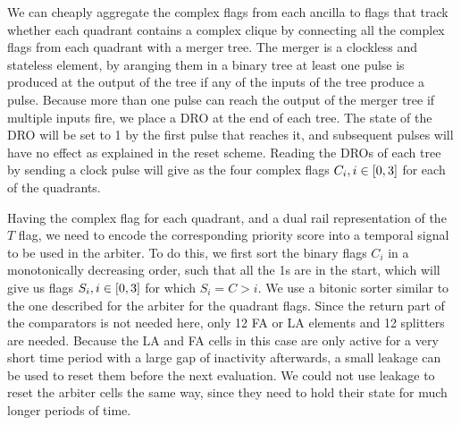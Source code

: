 \documentclass{article}
\begin{document}
We can cheaply aggregate the complex flags from each ancilla to flags that track whether each quadrant contains a complex clique by connecting all the complex flags from each quadrant with a merger tree.
The merger is a clockless and stateless element, by aranging them in a binary tree at least one pulse is produced at the output of the tree if any of the inputs of the tree produce a pulse.
Because more than one pulse can reach the output of the merger tree if multiple inputs fire, we place a DRO at the end of each tree.
The state of the DRO will be set to 1 by the first pulse that reaches it, and subsequent pulses will have no effect as explained in the reset scheme.
Reading the DROs of each tree by sending a clock pulse will give as the four complex flags $C_i, i \in \interval{0}{3}$ for each of the quadrants.

Having the complex flag for each quadrant, and a dual rail representation of the $T$ flag, we need to encode the corresponding priority score into a temporal signal to be used in the arbiter.
To do this, we first sort the binary flags $C_i$ in a monotonically decreasing order, such that all the 1s are in the start, which will give us flags $S_i, i \in \interval{0}{3}$ for which $S_i = C > i$.
We use a bitonic sorter similar to the one described for the arbiter for the quadrant flags.
Since the return part of the comparators is not needed here, only 12 FA or LA elements and 12 splitters are needed.
Because the LA and FA cells in this case are only active for a very short time period with a large gap of inactivity afterwards, a small leakage can be used to reset them before the next evaluation.
We could not use leakage to reset the arbiter cells the same way, since they need to hold their state for much longer periods of time.
\end{document}
